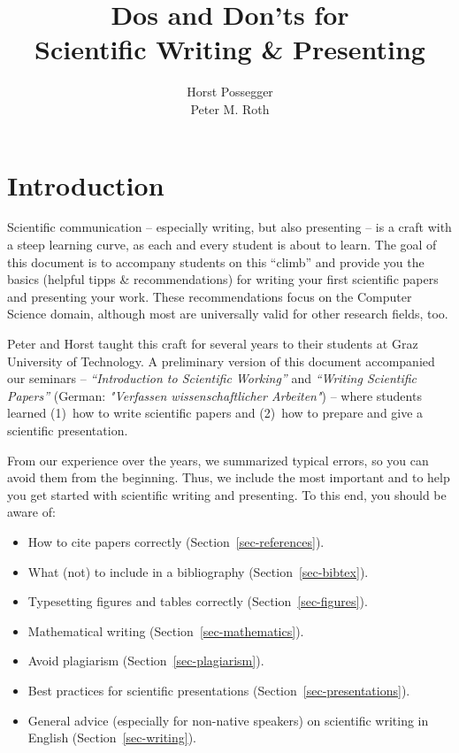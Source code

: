 \documentclass[11pt,a4paper]{article}
\author{Horst Possegger
        \\[0.2em]
        Peter M. Roth}
\title{Dos and Don'ts for\\[0.5em]Scientific Writing \& Presenting}
\begin{document}
\tableofcontents
\pagebreak

\section{Introduction}
\label{sec-intro}
Scientific communication -- especially writing, but also presenting -- is a craft with a steep learning curve, as each and every student is about to learn.
The goal of this document is to accompany students on this ``climb'' and provide you the basics (helpful tipps \& recommendations) for writing your first scientific papers and presenting your work.
These recommendations focus on the Computer Science domain, although most are universally valid for other research fields, too.

Peter and Horst taught this craft for several years to their students at Graz University of Technology.
A preliminary version of this document accompanied our seminars -- \emph{``Introduction to Scientific Working''} and \emph{``Writing Scientific Papers''} (German: \emph{"Verfassen wissenschaftlicher Arbeiten"}) -- where students learned (1)~how to write scientific papers and (2)~how to prepare and give a scientific presentation. 

From our experience over the years, we summarized typical errors, so you can avoid them from the beginning.
Thus, we include the most important  and  to help you get started with scientific writing and presenting.
To this end, you should be aware of:
\begin{itemize}
\item How to cite papers correctly (Section~\ref{sec-references}).
\item What (not) to include in a bibliography (Section~\ref{sec-bibtex}).
\item Typesetting figures and tables correctly (Section~\ref{sec-figures}).
\item Mathematical writing (Section~\ref{sec-mathematics}).
\item Avoid plagiarism (Section~\ref{sec-plagiarism}).
\item Best practices for scientific presentations (Section~\ref{sec-presentations}).
\item General advice (especially for non-native speakers) on scientific writing in English (Section~\ref{sec-writing}).
\end{itemize}
\end{document}
